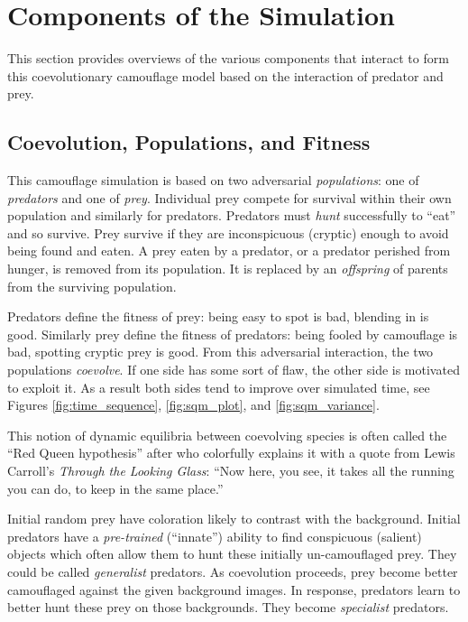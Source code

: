 \documentclass[letterpaper]{article}
\newcommand{\jargon}[1]{\textit{#1}}
\newcommand{\doublequotes}[1]{``#1''}
\begin{document}
\section{Components of the Simulation}

This section provides overviews of the various components that interact to form this coevolutionary camouflage model based on the interaction of predator and prey.

\subsection{Coevolution, Populations, and Fitness}
This camouflage simulation is based on two adversarial \jargon{populations}: one of \jargon{predators} and one of \jargon{prey}. Individual prey compete for survival within their own population and similarly for predators. Predators must \jargon{hunt} successfully to “eat” and so survive. Prey survive if they are inconspicuous (cryptic) enough to avoid being found and eaten. A prey eaten by a predator, or a predator perished from hunger, is removed from its population. It is replaced by an \jargon{offspring} of parents from the surviving population.
\par
Predators define the fitness of prey: being easy to spot is bad, blending in is good. Similarly prey define the fitness of predators: being fooled by camouflage is bad, spotting cryptic prey is good. From this adversarial interaction, the two populations \jargon{coevolve}. If one side has some sort of flaw, the other side is motivated to exploit it. As a result both sides tend to improve over simulated time, see Figures \ref{fig:time_sequence}, \ref{fig:sqm_plot}, and \ref{fig:sqm_variance}.
\par
This notion of dynamic equilibria between coevolving species is often called the “Red Queen hypothesis” after \citet{van_valen_new_1973} who colorfully explains it with a quote from Lewis Carroll's \textit{Through the Looking Glass}: “Now here, you see, it takes all the running you can do, to keep in the same place.”
\par
Initial random prey have coloration likely to contrast with the background. Initial predators have a \jargon{pre-trained} (\doublequotes{innate}) ability to find conspicuous (salient) objects which often allow them to hunt these initially un-camouflaged prey. They could be called \jargon{generalist} predators. As coevolution proceeds, prey become better camouflaged against the given background images. In response, predators learn to better hunt these prey on those backgrounds. They become \jargon{specialist} predators.
\par
\end{document}
